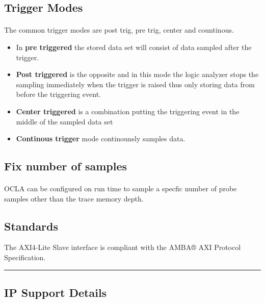 \subsection*{\fontsize{14}{16}\selectfont Trigger Modes}
\paragraph{} The common trigger modes are post trig, pre trig, center and countinous.
\begin{itemize}[noitemsep]
	\item In \textbf{pre triggered} the
	      stored data set will consist of data sampled after the trigger.
	\item \textbf{Post triggered} is the opposite and in
	      this mode the logic analyzer stops the sampling immediately when the trigger is raised
	      thus only storing data from before the triggering event.
	\item \textbf{Center triggered} is a combination putting the
	      triggering event in the middle of the sampled data set
	\item \textbf{Continous trigger} mode continounsly samples data.
\end{itemize}

\subsection*{ Fix number of samples}
\paragraph{} OCLA can be configured on run time to sample a specfic number of probe samples other than the trace memory depth.
\subsection*{\fontsize{14}{16}\selectfont Standards}
The AXI4-Lite Slave interface is compliant with the AMBA® AXI Protocol
Specification.
\par\noindent\rule{\textwidth}{0.4pt}
\newpage
  \subsection*{\fontsize{14}{16}\selectfont IP Support Details}


